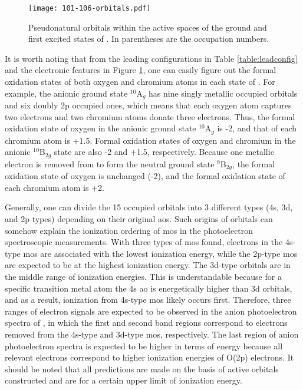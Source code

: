 \begin{refsection}
\begin{figure}[htb!]
	\centering
	\texttt{[image: 101-106-orbitals.pdf]}
	\caption{Pseudonatural orbitals within the active spaces of the ground and first excited states of . In parentheses are the occupation numbers.}
	\label{c6fig:orb}
\end{figure}
 

It is worth noting that from the leading configurations in Table \ref{table:leadconfig} and the electronic features in Figure \ref{c6fig:orb}, one can easily figure out the formal oxidation states of both oxygen and chromium atoms in each state of . For example, the anionic ground state $^{10}$A$_g$ has nine singly metallic occupied orbitals and six doubly 2p occupied ones, which means that each oxygen atom captures two electrons and two chromium atoms donate three electrons. Thus, the formal oxidation state of oxygen in the anionic ground state $^{10}$A$_g$ is -2, and that of each chromium atom is +1.5. Formal oxidation states of oxygen and chromium in the anionic $^{10}$B$_{2g}$ state are also -2 and +1.5, respectively. Because one metallic electron is removed from  to form the neutral ground state $^9$B$_{2g}$, the formal oxidation state of oxygen is unchanged (-2), and the formal oxidation state of each chromium atom is +2.






Generally, one can divide the 15 occupied orbitals into 3 different types (4s, 3d, and 2p types) depending on their original \acrshort{ao}s. Such origins of orbitals can somehow explain the ionization ordering of \acrshort{mo}s in the photoelectron spectroscopic measurements. With three types of \acrshort{mo}s found, electrons in the 4s-type \acrshort{mo}s are associated with the lowest ionization energy, while the 2p-type \acrshort{mo}s are expected to be at the highest ionization energy. The 3d-type orbitals are in the middle range of ionization energies. This is understandable because for a specific transition metal atom the 4s \acrshort{ao} is energetically higher than 3d orbitals, and as a result, ionization from 4s-type \acrshort{mo}s likely occurs first. Therefore, three ranges of electron signals are expected to be observed in the anion photoelectron spectra of , in which the first and second band regions correspond to electrons removed from the 4s-type and 3d-type \acrshort{mo}s, respectively. The last region of anion photoelectron spectra is expected to be higher in terms of energy because all relevant electrons correspond to higher ionization energies of O(2p) electrons. It should be noted that all predictions are made on the basis of active orbitals constructed and are for a certain upper limit of ionization energy.      


\end{refsection}
